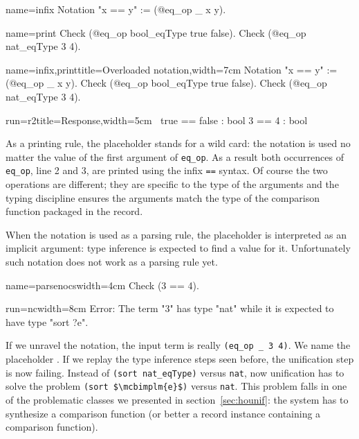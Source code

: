 \begin{coqdef}{name=infix}
Notation "x == y" := (@eq_op _ x y).
\end{coqdef}
\begin{coqdef}{name=print}
Check (@eq_op bool_eqType true false).
Check (@eq_op nat_eqType 3 4).
\end{coqdef}
\begin{coq-left}{name=infix,print}{title=Overloaded notation,width=7cm}
Notation "x == y" := (@eq_op _ x y).
Check (@eq_op bool_eqType true false).
Check (@eq_op nat_eqType 3 4).
\end{coq-left}
\begin{coqout-right}{run=r2}{title=Response,width=5cm}
$~$
true == false : bool
3 == 4 : bool
\end{coqout-right}

As a printing rule, the placeholder stands for a wild card: the
notation is used no matter the value of the first argument of
\lstinline/eq_op/.  As a result both occurrences of \lstinline/eq_op/,
line 2 and 3, are printed using the infix \lstinline/==/ syntax.
Of course the two operations are different; they are specific to the
type of the arguments and the typing discipline ensures the
arguments match the type of the comparison function packaged in
the record.

When the notation is used as a parsing rule, the placeholder is
interpreted as an implicit argument: type inference is expected to find a value
for it.  Unfortunately such notation does not work as a parsing rule
yet.

\begin{coq-left}{name=parsenocs}{width=4cm}
Check (3 == 4).
$~$
\end{coq-left}
\begin{coqout-right}{run=nc}{width=8cm}
Error: The term "3" has type "nat" while
it is expected to have type "sort ?e".
\end{coqout-right}

If we unravel the notation, the input term is really
\lstinline/(eq_op _ 3 4)/. We name the placeholder .
If we replay the type inference steps seen before, the unification
step is now failing.  Instead of \lstinline/(sort nat_eqType)/
versus \lstinline/nat/, now unification has to solve the problem
\lstinline/(sort $\mcbimplm{e}$)/ versus \lstinline/nat/.
This problem falls in one of the problematic classes we presented in
section~\ref{sec:hounif}: the system has to synthesize a comparison
function (or better a record instance containing a comparison
function).

